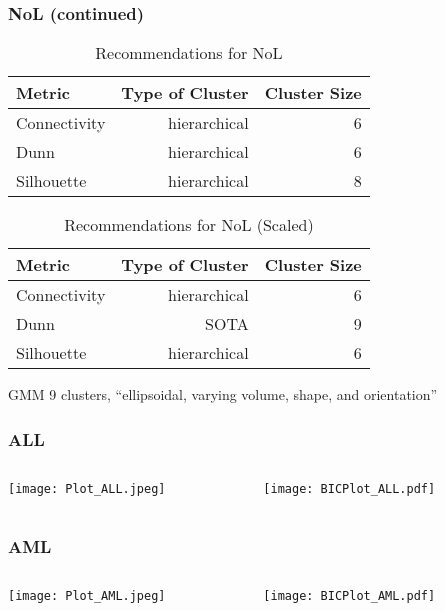 \documentclass[10pt,dvipsnames,table]{beamer}
\begin{document}
\begin{frame}
\frametitle{NoL (continued)}
\begin{table}[H]
\centering
\begin{tabular}{l|r|r}
\hline
Metric & Type of Cluster & Cluster Size \\ 
\hline
Connectivity & hierarchical & 6 \\
Dunn & hierarchical & 6 \\
Silhouette & hierarchical & 8 \\
\hline
\end{tabular}
\caption{Recommendations for NoL}
\end{table}

\begin{table}[H]
\centering
\begin{tabular}{l|r|r}
\hline
Metric & Type of Cluster & Cluster Size \\ 
\hline
Connectivity & hierarchical & 6 \\
Dunn & SOTA & 9 \\
Silhouette & hierarchical & 6 \\
\hline
\end{tabular}
\caption{Recommendations for NoL (Scaled)}
\end{table}

\begin{block}{GMM}
9 clusters, ``ellipsoidal, varying volume, shape, and orientation''
\end{block}
\end{frame}

\begin{frame}
\frametitle{ALL}
\begin{columns}
\begin{column}{5cm}
\texttt{[image: Plot\_ALL.jpeg]} \\
\end{column}
\begin{column}{5cm}
\pause \texttt{[image: BICPlot\_ALL.pdf]} \\
\end{column}
\end{columns}
\end{frame}

\begin{frame}
\frametitle{AML}
\begin{columns}
\begin{column}{5cm}
\texttt{[image: Plot\_AML.jpeg]} \\
\end{column}
\begin{column}{5cm}
\pause \texttt{[image: BICPlot\_AML.pdf]} \\
\end{column}
\end{columns}
\end{frame}
\end{document}
